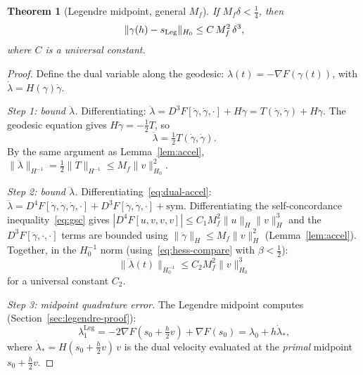 \documentclass[11pt]{article}
\newtheorem{theorem}{Theorem}
\begin{document}
\begin{theorem}[Legendre midpoint, general $M_f$]\label{thm:legendre-Mf}
If $M_f\delta < \frac{1}{4}$, then
\[
  \|\gamma(h) - s_{\textup{Leg}}\|_{H_0}
  \leq C\, M_f^2\, \delta^3,
\]
where $C$ is a universal constant.
\end{theorem}
\begin{proof}
Define the dual variable along the geodesic:
$\lambda(t) = -\nabla F(\gamma(t))$, with $\dot\lambda = H(\gamma)\dot\gamma$.

\medskip\noindent\textit{Step 1: bound $\ddot\lambda$.}\quad
Differentiating: $\ddot\lambda
= D^3F[\dot\gamma,\dot\gamma,\cdot] + H\ddot\gamma
= T(\dot\gamma,\dot\gamma) + H\ddot\gamma$.
The geodesic equation gives $H\ddot\gamma = -\frac{1}{2}T$, so
\begin{equation}\label{eq:dual-accel}
  \ddot\lambda = \tfrac{1}{2}T(\dot\gamma,\dot\gamma).
\end{equation}
By the same argument as Lemma~\ref{lem:accel},
$\|\ddot\lambda\|_{H^{-1}} = \frac{1}{2}\|T\|_{H^{-1}}
\leq M_f\|v\|_{H_0}^2$.

\medskip\noindent\textit{Step 2: bound $\dddot\lambda$.}\quad
Differentiating~\eqref{eq:dual-accel}:
$\dddot\lambda = D^4F[\dot\gamma,\dot\gamma,\dot\gamma,\cdot]
+ D^3F[\ddot\gamma,\dot\gamma,\cdot] + \text{sym}$.
Differentiating the self-concordance
inequality~\eqref{eq:gsc} gives
$|D^4F[u,v,v,v]| \leq C_1 M_f^2\|u\|_H\|v\|_H^3$ and the
$D^3F[\ddot\gamma,\cdot,\cdot]$ terms are bounded using
$\|\ddot\gamma\|_H \leq M_f\|v\|_H^2$
(Lemma~\ref{lem:accel}).  Together, in the $H_0^{-1}$ norm
(using~\eqref{eq:hess-compare} with $\beta < \frac{1}{2}$):
\begin{equation}\label{eq:dual-jerk}
  \|\dddot\lambda(t)\|_{H_0^{-1}} \leq C_2 M_f^2\|v\|_{H_0}^3
\end{equation}
for a universal constant $C_2$.

\medskip\noindent\textit{Step 3: midpoint quadrature error.}\quad
The Legendre midpoint computes (Section~\ref{sec:legendre-proof}):
\[
  \lambda_1^{\text{Leg}}
  = -2\nabla F(s_0 + \tfrac{h}{2}v) + \nabla F(s_0)
  = \lambda_0 + h\dot\lambda_*,
\]
where $\dot\lambda_* = H(s_0 + \frac{h}{2}v)\,v$ is the dual
velocity evaluated at the \emph{primal} midpoint $s_0 + \frac{h}{2}v$.


\end{proof}
\end{document}
